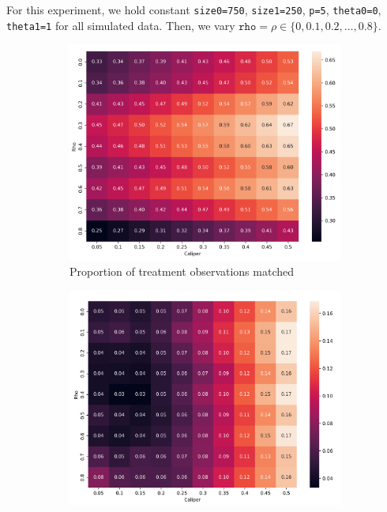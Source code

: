 \documentclass[11pt]{extarticle}
\begin{document}
For this experiment, we hold constant \texttt{size0=750}, \texttt{size1=250}, \texttt{p=5}, \texttt{theta0=0}, \texttt{theta1=1} for all simulated data.
Then, we vary $\texttt{rho} = \rho \in \{0, 0.1, 0.2, \ldots, 0.8\}$.

\begin{figure}[h!]
  \centering
  \begin{center}
    \begin{subfigure}[t]{0.49\textwidth}
        \centering
        \includegraphics[width=\textwidth]{./img/output30/caliper_vs_correlation_big/plots/rho_caliper_prop1_match.png}
        \caption{Proportion of treatment observations matched}
        \label{subfig:exp2_nmatch}
    \end{subfigure}
    \begin{subfigure}[t]{0.49\textwidth}
        \centering
        \includegraphics[width=\textwidth]{./img/output30/caliper_vs_correlation_big/plots/rho_caliper_mean_abs_smd.png}

\end{subfigure}
\end{center}
\end{figure}
\end{document}
